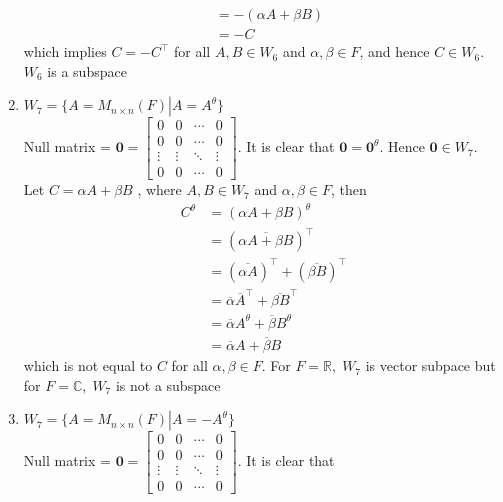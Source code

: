 \documentclass[a4paper, titlepage]{article}
\begin{document}
\begin{enumerate}[label=\textbf{\arabic*.}]
\begin{align*}
                    &= -(\alpha A + \beta B) \\
                    &= -C
    \end{align*}
    which implies $C = -C^\intercal$ for all $A, B \in W_6$ and 
    $\alpha, \beta \in F$, and hence $C \in W_6$. $W_6$ is a subspace
    \item $W_7 = \{ A = M_{n\times n}(F) \left. \right\vert 
    A = A^\theta \}$ \hfill \\
    Null matrix = $\textbf{0} =  
    \begin{bmatrix}
        0 & 0 & \cdots & 0 \\
        0 & 0 & \cdots & 0 \\
        \vdots & \vdots & \ddots & \vdots \\ 
        0 & 0 & \cdots & 0
    \end{bmatrix}$. It is clear that 
    $\textbf{0} = \textbf{0}^\theta$. Hence $\textbf{0} \in W_7$. \hfill \\
    Let 
    $C = \alpha A + \beta B$
    , where $A, B \in W_7$ and $\alpha, \beta \in F$, then 
    \begin{align*}
        C^\theta &= (\alpha A + \beta B)^\theta \\
                 &= (\overline{\alpha A + \beta B})^\top \\
                 &= (\overline{\alpha A})^\intercal + (\overline{\beta B})^\intercal \\
                 &= \overline{\alpha} \overline{A}^\intercal + \overline{\beta B}^\intercal \\
                 &= \overline{\alpha} A^\theta + \overline{\beta} B^\theta \\
                 &= \overline{\alpha} A + \overline{\beta} B
    \end{align*}
    which is not equal to $C$ for all $\alpha, \beta \in F$. 
    For $F = \mathbb{R}, \; W_7$ is vector subpace but for 
    $F = \mathbb{C}, \; W_7$ is not a subspace
    \item $W_7 = \{ A = M_{n\times n}(F) \left. \right\vert 
    A = -A^\theta \}$ \hfill \\
    Null matrix = $\textbf{0} =  
    \begin{bmatrix}
        0 & 0 & \cdots & 0 \\
        0 & 0 & \cdots & 0 \\
        \vdots & \vdots & \ddots & \vdots \\ 
        0 & 0 & \cdots & 0
    \end{bmatrix}$. It is clear that 

\end{enumerate}
\end{document}
